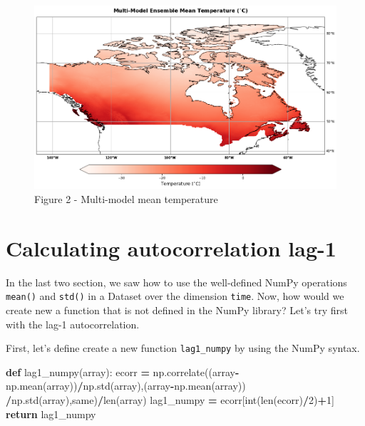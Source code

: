 \documentclass[
]{book}
\newenvironment{Shaded}{\begin{snugshade}}{\end{snugshade}}
\newcommand{\BuiltInTok}[1]{#1}
\newcommand{\ControlFlowTok}[1]{\textcolor[rgb]{0.13,0.29,0.53}{\textbf{#1}}}
\newcommand{\DecValTok}[1]{\textcolor[rgb]{0.00,0.00,0.81}{#1}}
\newcommand{\KeywordTok}[1]{\textcolor[rgb]{0.13,0.29,0.53}{\textbf{#1}}}
\newcommand{\NormalTok}[1]{#1}
\newcommand{\OperatorTok}[1]{\textcolor[rgb]{0.81,0.36,0.00}{\textbf{#1}}}
\newcommand{\StringTok}[1]{\textcolor[rgb]{0.31,0.60,0.02}{#1}}
\begin{document}
\begin{figure}
\centering
\includegraphics{output_19_1.png}
\caption{Figure 2 - Multi-model mean temperature}
\end{figure}

\hypertarget{calculating-autocorrelation-lag-1}{%
\section{Calculating autocorrelation lag-1}\label{calculating-autocorrelation-lag-1}}

In the last two section, we saw how to use the well-defined NumPy operations \texttt{mean()} and \texttt{std()} in a Dataset over the dimension \texttt{time}. Now, how would we create new a function that is not defined in the NumPy library? Let's try first with the lag-1 autocorrelation.

First, let's define create a new function \texttt{lag1\_numpy} by using the NumPy syntax.

\begin{Shaded}
\begin{Highlighting}[]
\KeywordTok{def}\NormalTok{ lag1\_numpy(array):}
\NormalTok{    ecorr }\OperatorTok{=}\NormalTok{ np.correlate((array}\OperatorTok{{-}}\NormalTok{np.mean(array))}\OperatorTok{/}\NormalTok{np.std(array),(array}\OperatorTok{{-}}\NormalTok{np.mean(array))}
                         \OperatorTok{/}\NormalTok{np.std(array),}\StringTok{\textquotesingle{}same\textquotesingle{}}\NormalTok{)}\OperatorTok{/}\BuiltInTok{len}\NormalTok{(array)}
\NormalTok{    lag1\_numpy }\OperatorTok{=}\NormalTok{ ecorr[}\BuiltInTok{int}\NormalTok{(}\BuiltInTok{len}\NormalTok{(ecorr)}\OperatorTok{/}\DecValTok{2}\NormalTok{)}\OperatorTok{+}\DecValTok{1}\NormalTok{]}
    \ControlFlowTok{return}\NormalTok{ lag1\_numpy}
\end{Highlighting}
\end{Shaded}
\end{document}
